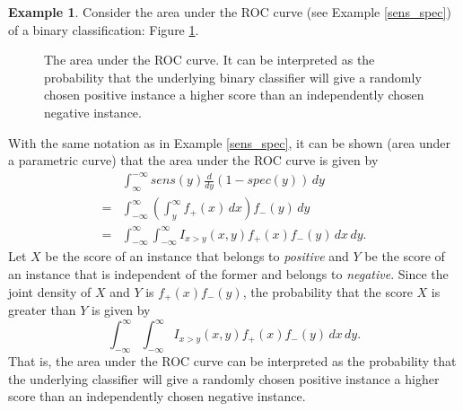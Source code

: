 \documentclass[12pt,letterpaper]{book}
\numberwithin{equation}{section}
\theoremstyle{definition}
\newtheorem{example}[thm]{\textbf{Example}}
\begin{document}
\begin{example} \label{area_under_roc}
Consider the area under the ROC curve (see Example \ref{sens_spec}) of a binary classification: Figure \ref{AUROC}. 

\begin{figure}[h]
\begin{center}
\end{center}
\caption{The area under the ROC curve. It can be interpreted as the probability that the underlying binary classifier will give a randomly chosen positive instance a higher score than an independently chosen negative instance.}
\label{AUROC}
\end{figure}

With the same notation as in Example \ref{sens_spec}, it can be shown (area under a parametric curve) that the area under the ROC curve is given by
\begin{align*}&\int_{\infty}^{-\infty}sens(y)\frac{d}{dy}\left(1-spec(y)\right)\,dy\\
=&\int_{-\infty}^{\infty}\left(\int_y^\infty f_+(x)\,dx\right)f_-(y)\,dy\\
=&\int_{-\infty}^{\infty}\int_{-\infty}^{\infty} I_{x>y}(x,y) f_+(x)f_-(y)\,dx\,dy.
\end{align*}
Let $X$ be the score of an instance that belongs to \textit{positive} and $Y$ be the score of an instance that is independent of the former and belongs to \textit{negative}. Since the joint density of $X$ and $Y$ is $f_+(x)f_-(y)$, the probability that the score $X$ is greater than $Y$ is given by
$$\int_{-\infty}^{\infty}\int_{-\infty}^{\infty} I_{x>y}(x,y) f_+(x)f_-(y)\,dx\,dy.$$
That is, the area under the ROC curve can be interpreted as the probability that the underlying classifier will give a randomly chosen positive instance a higher score than an independently chosen negative instance.

\end{example}
\end{document}
